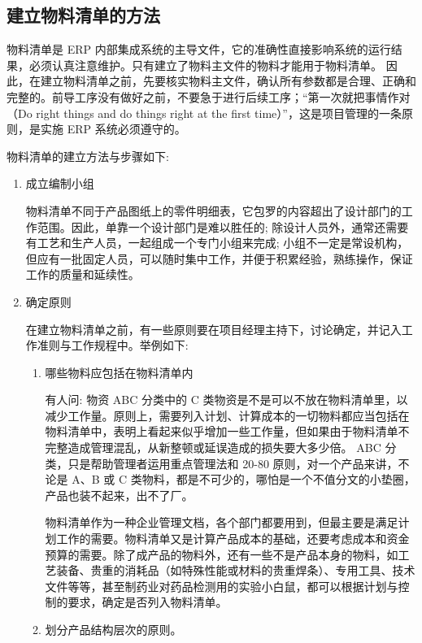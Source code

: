 \subsection {建立物料清单的方法}

    物料清单是 ERP 内部集成系统的主导文件，它的准确性直接影响系统的运行结果，必须认真注意维护。只有建立了物料主文件的物料才能用于物料清单。 因此，在建立物料清单之前，先要核实物料主文件，确认所有参数都是合理、正确和完整的。前导工序没有做好之前，不要急于进行后续工序；“第一次就把事情作对（Do right things and do things right at the ﬁrst time）”，这是项目管理的一条原则，是实施 ERP 系统必须遵守的。

    物料清单的建立方法与步骤如下:

\begin{enumerate}

    \item 成立编制小组

        物料清单不同于产品图纸上的零件明细表，它包罗的内容超出了设计部门的工作范围。因此，单靠一个设计部门是难以胜任的; 除设计人员外，通常还需要有工艺和生产人员，一起组成一个专门小组来完成; 小组不一定是常设机构，但应有一批固定人员，可以随时集中工作，并便于积累经验，熟练操作，保证工作的质量和延续性。

    \item 确定原则

        在建立物料清单之前，有一些原则要在项目经理主持下，讨论确定，并记入工作准则与工作规程中。举例如下:

        \begin{enumerate}
        \item 哪些物料应包括在物料清单内

        \indent 有人问: 物资 ABC 分类中的 C 类物资是不是可以不放在物料清单里，以减少工作量。原则上，需要列入计划、计算成本的一切物料都应当包括在物料清单中，表明上看起来似乎增加一些工作量，但如果由于物料清单不完整造成管理混乱，从新整顿或延误造成的损失要大多少倍。 ABC 分类，只是帮助管理者运用重点管理法和 20-80 原则，对一个产品来讲，不论是 A、B 或 C 类物料，都是不可少的，哪怕是一个不值分文的小垫圈，产品也装不起来，出不了厂。

        物料清单作为一种企业管理文档，各个部门都要用到，但最主要是满足计划工作的需要。物料清单又是计算产品成本的基础，还要考虑成本和资金预算的需要。除了成产品的物料外，还有一些不是产品本身的物料，如工艺装备、贵重的消耗品（如特殊性能或材料的贵重焊条）、专用工具、技术文件等等，甚至制药业对药品检测用的实验小白鼠，都可以根据计划与控制的要求，确定是否列入物料清单。

        \item 划分产品结构层次的原则。


\end{enumerate}
\end{enumerate}
